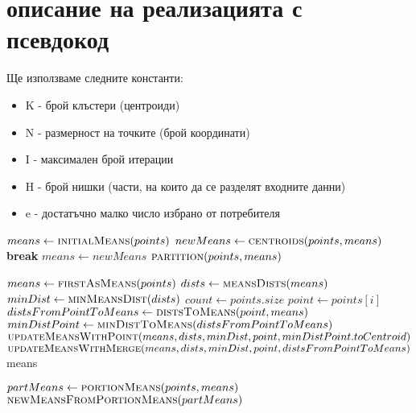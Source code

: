 \documentclass[a4paper, 12pt]{article}
\begin{document}
\section{описание на реализацията с псевдокод}
Ще използваме следните константи:
\begin{itemize}
\item K - брой клъстери (центроиди)
\item N - размерност на точките (брой координати)
\item I - максимален брой итерации
\item H - брой нишки (части, на които да се разделят входните данни)
\item e - достатъчно малко число избрано от потребителя
\end{itemize}
\begin{algorithm}[H]
\begin{algorithmic}[1]
\State \(means \gets \Call{initialMeans}{points}\)
\State \(newMeans \gets \Call{centroids}{points, means}\)
\textbf{break}
\EndIf
\State \(means \gets newMeans\)
\EndFor 
\State \Return \(\Call{partition}{points, means}\)
\EndFunction
\end{algorithmic}
\end{algorithm}
\begin{algorithm}[H]
\begin{algorithmic}[1]
\State \(means \gets \Call{firstAsMeans}{points}\)
\State \(dists \gets \Call{meansDists}{means}\)
\State \(minDist \gets \Call{minMeansDist}{dists}\)
\State \(count \gets points.size\)
\State \(point \gets points[i]\)
\State \(distsFromPointToMeans \gets \Call{distsToMeans}{point, means}\)
\State \(minDistPoint \gets \Call{minDistToMeans}{distsFromPointToMeans}\)
\State \(\Call{updateMeansWithPoint}{means, dists, minDist, point, minDistPoint.toCentroid}\)
\Else
\State \(\Call{updateMeansWithMerge}{means, dists, minDist, point, distsFromPointToMeans}\)
\EndIf
\EndFor
\State \Return means
\EndFunction
\end{algorithmic}
\end{algorithm}
\begin{algorithm}[H]
\begin{algorithmic}[1]
\State \(partMeans \gets \Call{portionMeans}{points, means}\)
\State \Return \(\Call{newMeansFromPortionMeans}{partMeans}\)
\EndFunction
\end{algorithmic}
\end{algorithm}
\end{document}
